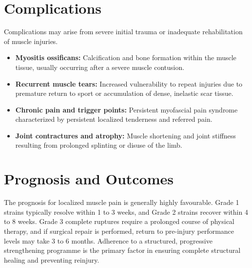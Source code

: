 \section*{Complications}
Complications may arise from severe initial trauma or inadequate rehabilitation of muscle injuries.
\begin{itemize}
    \item \textbf{Myositis ossificans:} Calcification and bone formation within the muscle tissue, usually occurring after a severe muscle contusion.
    \item \textbf{Recurrent muscle tears:} Increased vulnerability to repeat injuries due to premature return to sport or accumulation of dense, inelastic scar tissue.
    \item \textbf{Chronic pain and trigger points:} Persistent myofascial pain syndrome characterized by persistent localized tenderness and referred pain.
    \item \textbf{Joint contractures and atrophy:} Muscle shortening and joint stiffness resulting from prolonged splinting or disuse of the limb.
\end{itemize}

\section*{Prognosis and Outcomes}
The prognosis for localized muscle pain is generally highly favourable. Grade 1 strains typically resolve within 1 to 3 weeks, and Grade 2 strains recover within 4 to 8 weeks. Grade 3 complete ruptures require a prolonged course of physical therapy, and if surgical repair is performed, return to pre-injury performance levels may take 3 to 6 months. Adherence to a structured, progressive strengthening programme is the primary factor in ensuring complete structural healing and preventing reinjury.

